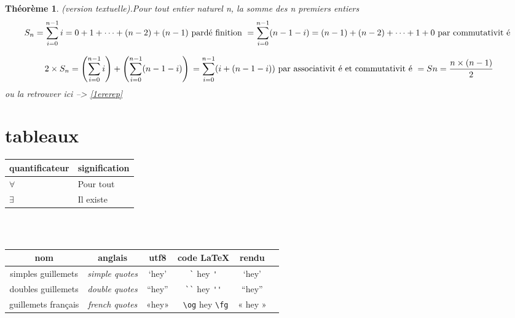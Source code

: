 \documentclass[french,titlepage] {article}
\newtheorem {theorem}{Théorème}
\begin{document}
\begin{theorem}(version textuelle).Pour tout entier naturel n, la somme des n premiers entiers
\begin{equation}
S_n  = \sum_ { i = 0 } ^ { n - 1 } i
= 0 + 1 + \cdots + ( n - 2) + ( n - 1)
 \text { pardé finition } \\
 = \sum_ { i = 0 } ^ { n - 1 } ( n - 1 - i )
= ( n - 1) + ( n - 2) + \cdots + 1 + 0
 \text { par commutativit é } \\
\end{equation}

\begin{equation*}
2 \times S_n
 = \left ( \sum_ { i = 0 } ^ { n - 1 } i\right )
+ \left ( \sum_ { i = 0 } ^ { n - 1 } ( n - 1 - i ) \right ) \\
 = \sum_ { i = 0 } ^ { n - 1 } ( i + ( n - 1 - i ))
 \text { par associativit é et commutativit é } \\
 = Sn = \frac {n \times(n - 1)}{2} 
\end{equation*}
ou la retrouver ici --> \ref{1ererep}
\end{theorem}

\section{tableaux}

\begin{tabular}{|l|l|}
\hline
  \textbf{quantificateur} & \textbf{signification} \\
  \hline
  \hline
   $\forall$ & Pour tout    \\
   \hline
  $\exists$ & Il existe     \\
   \hline
\end{tabular}
\\
 \\
\begin{tabular}{cccccc}
\textbf{nom} & \textbf{anglais} & \textbf{utf8} & \textbf{code} \LaTeX & \textbf{rendu} \\
\hline
 simples guillemets & \textit{simple quotes} & ‘hey’ &
\verb{`{ hey \verb{'{  & ‘hey’\\
 doubles guillemets & \textit{double quotes} & “hey” &
\verb{``{ hey \verb{''{ & “hey”\\
 guillemets français & \textit{french quotes} & «hey» & \verb{ \og{ hey \verb{\fg{ & « hey » \\
\end{tabular}
\end{document}

